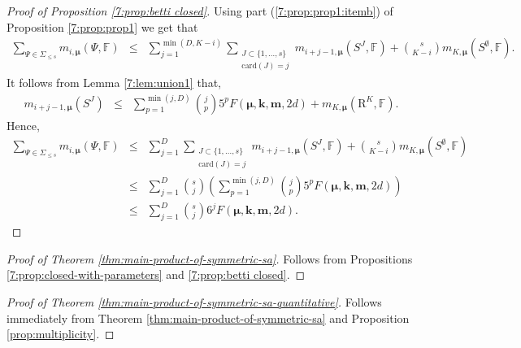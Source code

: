 \documentclass{amsart}
\theoremstyle{definition}
\theoremstyle{remark}
\numberwithin{equation}{section}
\begin{document}
\begin{proof}[Proof of Proposition \ref{7:prop:betti closed}]
Using part (\ref{7:prop:prop1:itemb}) of Proposition \ref{7:prop:prop1} we get that
\begin{eqnarray*}
  \sum_{\Psi \in \Sigma_{\le s}} m_{i,\pmb{\mu}} (\Psi,{\mathbb{F}}) & \leq & \sum_{j=1}^{\min(D,K-i)}
  \sum_{\begin{array}{c}
    J \subset \{ 1, \ldots ,s \}\\
    {\mathrm{card}}(J) =j
  \end{array}} m_{i+j-1,\pmb{\mu}} (S^{J},{\mathbb{F}}) + \binom{s}{K-i}
  m_{K,\pmb{\mu}} (S^{\emptyset},{\mathbb{F}}).
\end{eqnarray*}
It follows from Lemma \ref{7:lem:union1} that,
\begin{eqnarray*}
  m_{i+j-1,\pmb{\mu}} (S^{J}) & \leq & \sum_{p =1}^{\min (j,D)} \binom{j}{p}
  5^{p} F (\pmb{\mu},\mathbf{k},{\mathbf{m}},2 d) +m_{K,\pmb{\mu}}({\mathrm{R}}^{K},{\mathbb{F}}) .
\end{eqnarray*}
Hence,
\begin{eqnarray*}
  \sum_{\Psi \in \Sigma_{\le s}} m_{i,\pmb{\mu}} (\Psi,{\mathbb{F}})
  & \leq & \sum_{j=1}^{D}
  \sum_{\substack{
    J \subset \{ 1, \ldots ,s \}\\
    {\mathrm{card}} (J) =j}}
 m_{i+j-1,\pmb{\mu}} (S^{J}, {\mathbb{F}}) + \binom{s}{K-i}
  m_{K,\pmb{\mu}} (S^{\emptyset},{\mathbb{F}})\\
  & \leq & \sum_{j=1}^{D} \binom{s}{j} \left(\sum_{p=1}^{\min (
  j,D)} \binom{j}{p} 5^{p}  F (\pmb{\mu},\mathbf{k},{\mathbf{m}},2d) \right)\\
  & \leq & \sum_{j=1}^{D} \binom{s}{j} 6^{j} F (\pmb{\mu},\mathbf{k},{\mathbf{m}},2d) .
\end{eqnarray*}
\end{proof}

\begin{proof}[Proof of Theorem \ref{thm:main-product-of-symmetric-sa}]
Follows from Propositions \ref{7:prop:closed-with-parameters} and \ref{7:prop:betti closed}.
\end{proof}

\begin{proof}[Proof of Theorem \ref{thm:main-product-of-symmetric-sa-quantitative}]
Follows immediately from Theorem \ref{thm:main-product-of-symmetric-sa} and 
Proposition \ref{prop:multiplicity}. 
\end{proof}
\end{document}
